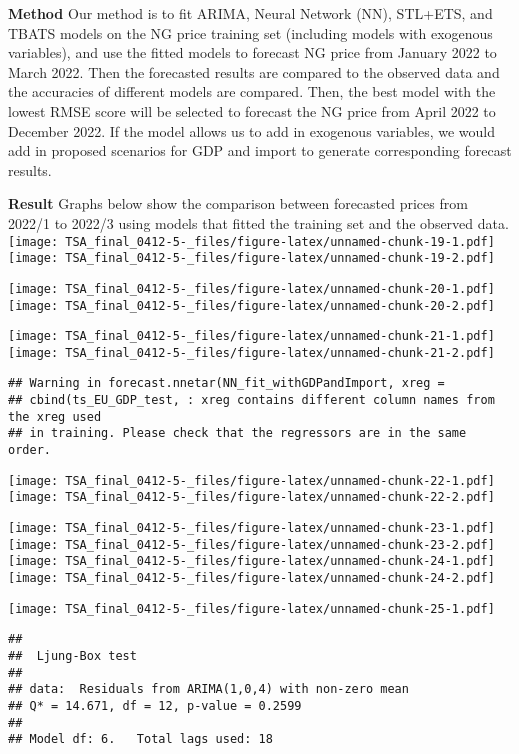 \documentclass[
]{article}
\begin{document}
\textbf{Method} Our method is to fit ARIMA, Neural Network (NN),
STL+ETS, and TBATS models on the NG price training set (including models
with exogenous variables), and use the fitted models to forecast NG
price from January 2022 to March 2022. Then the forecasted results are
compared to the observed data and the accuracies of different models are
compared. Then, the best model with the lowest RMSE score will be
selected to forecast the NG price from April 2022 to December 2022. If
the model allows us to add in exogenous variables, we would add in
proposed scenarios for GDP and import to generate corresponding forecast
results.

\textbf{Result} Graphs below show the comparison between forecasted
prices from 2022/1 to 2022/3 using models that fitted the training set
and the observed data.
\texttt{[image: TSA\_final\_0412-5-\_files/figure-latex/unnamed-chunk-19-1.pdf]}
\texttt{[image: TSA\_final\_0412-5-\_files/figure-latex/unnamed-chunk-19-2.pdf]}

\texttt{[image: TSA\_final\_0412-5-\_files/figure-latex/unnamed-chunk-20-1.pdf]}
\texttt{[image: TSA\_final\_0412-5-\_files/figure-latex/unnamed-chunk-20-2.pdf]}

\texttt{[image: TSA\_final\_0412-5-\_files/figure-latex/unnamed-chunk-21-1.pdf]}
\texttt{[image: TSA\_final\_0412-5-\_files/figure-latex/unnamed-chunk-21-2.pdf]}

\begin{verbatim}
## Warning in forecast.nnetar(NN_fit_withGDPandImport, xreg =
## cbind(ts_EU_GDP_test, : xreg contains different column names from the xreg used
## in training. Please check that the regressors are in the same order.
\end{verbatim}

\texttt{[image: TSA\_final\_0412-5-\_files/figure-latex/unnamed-chunk-22-1.pdf]}
\texttt{[image: TSA\_final\_0412-5-\_files/figure-latex/unnamed-chunk-22-2.pdf]}

\texttt{[image: TSA\_final\_0412-5-\_files/figure-latex/unnamed-chunk-23-1.pdf]}
\texttt{[image: TSA\_final\_0412-5-\_files/figure-latex/unnamed-chunk-23-2.pdf]}
\texttt{[image: TSA\_final\_0412-5-\_files/figure-latex/unnamed-chunk-24-1.pdf]}
\texttt{[image: TSA\_final\_0412-5-\_files/figure-latex/unnamed-chunk-24-2.pdf]}

\texttt{[image: TSA\_final\_0412-5-\_files/figure-latex/unnamed-chunk-25-1.pdf]}

\begin{verbatim}
## 
##  Ljung-Box test
## 
## data:  Residuals from ARIMA(1,0,4) with non-zero mean
## Q* = 14.671, df = 12, p-value = 0.2599
## 
## Model df: 6.   Total lags used: 18
\end{verbatim}
\end{document}
